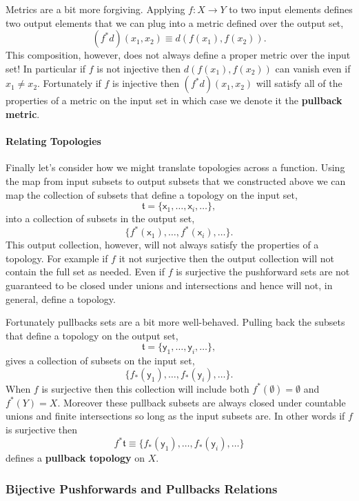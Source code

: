 \documentclass[
  letterpaper,
  DIV=11,
  numbers=noendperiod]{scrartcl}
\let\oldparagraph\paragraph
\renewcommand{\paragraph}[1]{\oldparagraph{#1}\mbox{}}
\begin{document}
Metrics are a bit more forgiving. Applying \(f : X \rightarrow Y\) to
two input elements defines two output elements that we can plug into a
metric defined over the output set, \[
(f^{*} d)(x_1, x_2) \equiv d(f(x_1), f(x_2)).
\] This composition, however, does not always define a proper metric
over the input set! In particular if \(f\) is not injective then
\(d(f(x_1), f(x_2))\) can vanish even if \(x_1 \ne x_2\). Fortunately if
\(f\) is injective then \((f^{*} d)(x_1, x_2)\) will satisfy all of the
properties of a metric on the input set in which case we denote it the
\textbf{pullback metric}.

\hypertarget{relating-topologies}{%
\paragraph{Relating Topologies}\label{relating-topologies}}

Finally let's consider how we might translate topologies across a
function. Using the map from input subsets to output subsets that we
constructed above we can map the collection of subsets that define a
topology on the input set, \[
\mathfrak{t} = \{ \mathsf{x}_{1}, \ldots, \mathsf{x}_{i}, \ldots \},
\] into a collection of subsets in the output set, \[
\{ f^{*}(\mathsf{x}_{1}), \ldots, f^{*}(\mathsf{x}_{i}), \ldots \}.
\] This output collection, however, will not always satisfy the
properties of a topology. For example if \(f\) it not surjective then
the output collection will not contain the full set as needed. Even if
\(f\) is surjective the pushforward sets are not guaranteed to be closed
under unions and intersections and hence will not, in general, define a
topology.

Fortunately pullbacks sets are a bit more well-behaved. Pulling back the
subsets that define a topology on the output set, \[
\mathfrak{t} = \{ \mathsf{y}_{1}, \ldots, \mathsf{y}_{i}, \ldots \},
\] gives a collection of subsets on the input set, \[
\{ f_{*}(\mathsf{y}_{1}), \ldots, f_{*}(\mathsf{y}_{i}), \ldots \}.
\] When \(f\) is surjective then this collection will include both
\(f^{*}(\emptyset) = \emptyset\) and \(f^{*}(Y) = X\). Moreover these
pullback subsets are always closed under countable unions and finite
intersections so long as the input subsets are. In other words if \(f\)
is surjective then \[
f^{*} \mathfrak{t} \equiv
\{ f_{*}(\mathsf{y}_{1}), \ldots, f_{*}(\mathsf{y}_{i}), \ldots \}
\] defines a \textbf{pullback topology} on \(X\).

\hypertarget{bijective-pushforwards-and-pullbacks-relations}{%
\subsubsection{Bijective Pushforwards and Pullbacks
Relations}\label{bijective-pushforwards-and-pullbacks-relations}}
\end{document}
